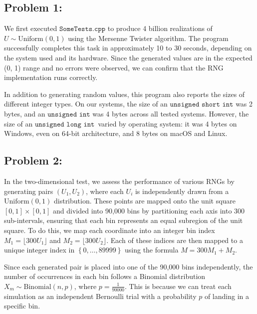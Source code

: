 \documentclass{article}
\begin{document}
\subsection*{Problem 1:}  

\hspace{1.5em}We first executed \(\texttt{SomeTests.cpp}\) to produce 4 billion realizations of \(U \sim \text{Uniform}(0, 1) \) using the Mersenne Twister algorithm. The program successfully completes this task in approximately 10 to 30 seconds, depending on the system used and its hardware. Since the generated values are in the expected (0, 1) range and no errors were observed, we can confirm that the RNG implementation runs correctly. 

In addition to generating random values, this program also reports the sizes of different integer types. On our systems, the size of an \(\texttt{unsigned short int}\) was 2 bytes, and an \(\texttt{unsigned int}\) was 4 bytes across all tested systems. However, the size of an \(\texttt{unsigned long int}\)\ varied by operating system: it was 4 bytes on Windows, even on 64-bit architecture, and 8 bytes on macOS and Linux.

\subsection*{Problem 2:}  

\hspace{1.5em}In the two-dimensional test, we assess the performance of various RNGs by generating pairs \((U_1, U_2)\), where each \(U_i\) is independently drawn from a \(\text{Uniform}(0, 1)\) distribution. These points are mapped onto the unit square \([0, 1] \times [0, 1]\) and divided into 90,000 bins by partitioning each axis into 300 sub-intervals, ensuring that each bin represents an equal subregion of the unit square. To do this, we map each coordinate into an integer bin index \(M_1 = \lfloor300U_1\rfloor\) and \(M_2 = \lfloor300U_2\rfloor\). Each of these indices are then mapped to a unique integer index in \(\left\{0, \dots, 89999\right\}\) using the formula \(M = 300M_1 + M_2\).

Since each generated pair is placed into one of the 90,000 bins independently, the number of occurrences in each bin follows a Binomial distribution \(X_m \sim \text{Binomial}(n, p)\), where \(p = \frac{1}{90000}\). This is because we can treat each simulation as an independent Bernoulli trial with a probability \(p\) of landing in a specific bin.
\end{document}
